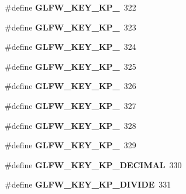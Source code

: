 \begin{DoxyCompactItemize}
\item 
\hypertarget{group__keys_gaf82d5a802ab8213c72653d7480c16f13}{}\#define {\bfseries G\+L\+F\+W\+\_\+\+K\+E\+Y\+\_\+\+K\+P\+\_}~322\label{group__keys_gaf82d5a802ab8213c72653d7480c16f13}

\item 
\hypertarget{group__keys_ga7e25ff30d56cd512828c1d4ae8d54ef2}{}\#define {\bfseries G\+L\+F\+W\+\_\+\+K\+E\+Y\+\_\+\+K\+P\+\_}~323\label{group__keys_ga7e25ff30d56cd512828c1d4ae8d54ef2}

\item 
\hypertarget{group__keys_gada7ec86778b85e0b4de0beea72234aea}{}\#define {\bfseries G\+L\+F\+W\+\_\+\+K\+E\+Y\+\_\+\+K\+P\+\_}~324\label{group__keys_gada7ec86778b85e0b4de0beea72234aea}

\item 
\hypertarget{group__keys_ga9a5be274434866c51738cafbb6d26b45}{}\#define {\bfseries G\+L\+F\+W\+\_\+\+K\+E\+Y\+\_\+\+K\+P\+\_}~325\label{group__keys_ga9a5be274434866c51738cafbb6d26b45}

\item 
\hypertarget{group__keys_gafc141b0f8450519084c01092a3157faa}{}\#define {\bfseries G\+L\+F\+W\+\_\+\+K\+E\+Y\+\_\+\+K\+P\+\_}~326\label{group__keys_gafc141b0f8450519084c01092a3157faa}

\item 
\hypertarget{group__keys_ga8882f411f05d04ec77a9563974bbfa53}{}\#define {\bfseries G\+L\+F\+W\+\_\+\+K\+E\+Y\+\_\+\+K\+P\+\_}~327\label{group__keys_ga8882f411f05d04ec77a9563974bbfa53}

\item 
\hypertarget{group__keys_gab2ea2e6a12f89d315045af520ac78cec}{}\#define {\bfseries G\+L\+F\+W\+\_\+\+K\+E\+Y\+\_\+\+K\+P\+\_}~328\label{group__keys_gab2ea2e6a12f89d315045af520ac78cec}

\item 
\hypertarget{group__keys_gafb21426b630ed4fcc084868699ba74c1}{}\#define {\bfseries G\+L\+F\+W\+\_\+\+K\+E\+Y\+\_\+\+K\+P\+\_}~329\label{group__keys_gafb21426b630ed4fcc084868699ba74c1}

\item 
\hypertarget{group__keys_ga4e231d968796331a9ea0dbfb98d4005b}{}\#define {\bfseries G\+L\+F\+W\+\_\+\+K\+E\+Y\+\_\+\+K\+P\+\_\+\+D\+E\+C\+I\+M\+A\+L}~330\label{group__keys_ga4e231d968796331a9ea0dbfb98d4005b}

\item 
\hypertarget{group__keys_gabca1733780a273d549129ad0f250d1e5}{}\#define {\bfseries G\+L\+F\+W\+\_\+\+K\+E\+Y\+\_\+\+K\+P\+\_\+\+D\+I\+V\+I\+D\+E}~331\label{group__keys_gabca1733780a273d549129ad0f250d1e5}


\end{DoxyCompactItemize}
